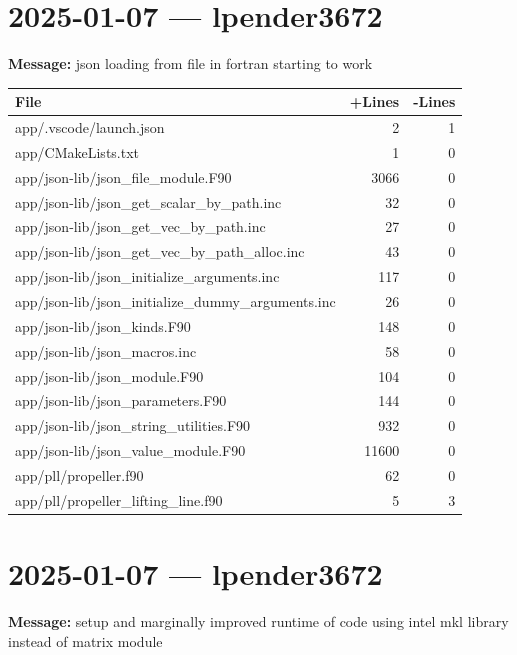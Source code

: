 \documentclass{article}
\begin{document}
\section*{2025-01-07 --- lpender3672}
\textbf{Message:} json loading from file in fortran starting to work

\begin{longtable}{|p{10cm}|r|r|}
\hline \textbf{File} & \textbf{+Lines} & \textbf{-Lines} \\
\hline
app/.vscode/launch.json & 2 & 1 \\
\hline
app/CMakeLists.txt & 1 & 0 \\
\hline
app/json-lib/json\_file\_module.F90 & 3066 & 0 \\
\hline
app/json-lib/json\_get\_scalar\_by\_path.inc & 32 & 0 \\
\hline
app/json-lib/json\_get\_vec\_by\_path.inc & 27 & 0 \\
\hline
app/json-lib/json\_get\_vec\_by\_path\_alloc.inc & 43 & 0 \\
\hline
app/json-lib/json\_initialize\_arguments.inc & 117 & 0 \\
\hline
app/json-lib/json\_initialize\_dummy\_arguments.inc & 26 & 0 \\
\hline
app/json-lib/json\_kinds.F90 & 148 & 0 \\
\hline
app/json-lib/json\_macros.inc & 58 & 0 \\
\hline
app/json-lib/json\_module.F90 & 104 & 0 \\
\hline
app/json-lib/json\_parameters.F90 & 144 & 0 \\
\hline
app/json-lib/json\_string\_utilities.F90 & 932 & 0 \\
\hline
app/json-lib/json\_value\_module.F90 & 11600 & 0 \\
\hline
app/pll/propeller.f90 & 62 & 0 \\
\hline
app/pll/propeller\_lifting\_line.f90 & 5 & 3 \\
\hline
\end{longtable}

\section*{2025-01-07 --- lpender3672}
\textbf{Message:} setup and marginally improved runtime of code using intel mkl library instead of matrix module
\end{document}
